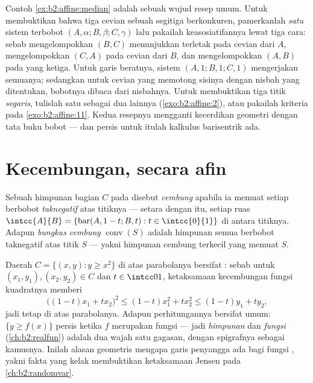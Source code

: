 \begin{remark}
Contoh \cref{ex:b2:affine:median} adalah sebuah wujud resep
umum. Untuk membuktikan bahwa tiga cevian sebuah segitiga
berkonkuren, pamerkanlah \emph{satu} sistem terbobot $(A,
\alpha; B, \beta; C, \gamma)$ lalu pakailah keasosiatifannya lewat tiga
cara: sebab mengelompokkan $(B, C)$ menunjukkan  terletak pada
cevian dari $A$, mengelompokkan $(C, A)$ pada cevian dari $B$,
dan mengelompokkan $(A, B)$ pada yang ketiga. Untuk garis beratnya, sistem
$(A, 1; B, 1; C, 1)$ mengerjakan semuanya; sedangkan untuk cevian yang memotong
sisinya dengan nisbah yang ditentukan, bobotnya dibaca dari
nisbahnya. Untuk membuktikan tiga titik \emph{segaris}, tulislah satu sebagai
 dua lainnya (\cref{exo:b2:affine:2}), atau pakailah
kriteria  pada \cref{exo:b2:affine:11}. Kedua
resepnya mengganti kecerdikan geometri dengan tata buku bobot ---
dan persis untuk itulah kalkulus barisentrik ada.
\end{remark}

\section{Kecembungan, secara afin}

\begin{definition}\label{def:b2:affine:convex}
Sebuah himpunan bagian $C$ pada  disebut \emph{cembung} apabila ia memuat
setiap  berbobot \emph{taknegatif} atas titiknya ---
setara dengan itu, setiap ruas $\intcc{A}{B} = \{\operatorname{bar}(A,
1-t; B, t) : t \in \intcc{0}{1}\}$ di antara titiknya. Adapun
\emph{bungkus cembung} $\operatorname{conv}(S)$ adalah himpunan semua
 berbobot taknegatif atas titik $S$ --- yakni himpunan
cembung terkecil yang memuat $S$.
\end{definition}

\begin{example}\label{ex:b2:affine:epigraph}
Daerah $C = \{(x, y) : y \geq x^2\}$ di atas parabolanya
bersifat : sebab untuk $(x_1, y_1), (x_2, y_2) \in C$ dan $t \in
\intcc01$, ketaksamaan kecembungan fungsi kuadratnya
memberi
\[
\bigl((1-t)x_1 + tx_2\bigr)^2 \leq (1-t)x_1^2 + tx_2^2
\leq (1-t)y_1 + ty_2 ,
\]
jadi  tetap di atas parabolanya. Adapun perhitungannya
bersifat umum: $\{y \geq f(x)\}$  persis ketika $f$ merupakan
fungsi  --- jadi \emph{himpunan}  dan \emph{fungsi}
 (\cref{ch:b2:realfun}) adalah dua wajah satu
gagasan, dengan epigrafnya sebagai kamusnya. Inilah alasan geometris
mengapa garis penyangga ada bagi fungsi , yakni fakta
yang kelak membuktikan ketaksamaan Jensen pada
\cref{ch:b2:randomvar}.
\end{example}

